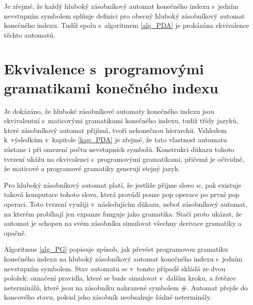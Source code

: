 Je zřejmé, že každý hluboký zásobníkový automat konečného indexu s~jedním nevstupním symbolem splňuje definici pro obecný hluboký zásobníkový automat konečného indexu. Tudíž spolu s~algoritmem \ref{alg_PDA} je prokázána ekvivalence těchto automatů.

\section{Ekvivalence s~programovými gramatikami konečného indexu}


Je dokázáno, že hluboké zásobníkové automaty konečného indexu jsou ekvivalentní s~maticovými gramatikami konečného indexu, tudíž třídy jazyků, které zásobníkový automat přijímá, tvoří nekonečnou hierarchii. \cite{Meduna:DeepPDA} Vzhledem k~výsledkům v~kapitole \ref{kap_PDA} je zřejmé, že tato vlastnost automatu zůstane i při omezení počtu nevstupních symbolů. Konstrukci důkazu tohoto tvrzení ukážu na ekvivalenci s~programovými gramatikami, přičemž je očividné, že maticové a programové gramatiky generují stejný jazyk.

Pro hluboký zásobníkový automat platí, že jestliže přijme slovo $w$, pak existuje taková komputace tohoto slova, která provádí pouze pop operace po první pop operaci. \cite{Meduna:DeepPDA} Toto tvrzení využiji v~následujícím důkazu, neboť zásobníkový automat, na kterém probíhají jen expanze funguje jako gramatika. Stačí proto ukázat, že automat je schopen na svém zásobníku simulovat všechny derivace gramatiky a opačně.


Algoritmus \ref{alg_PG} popisuje způsob, jak převést programovou gramatiku konečného indexu na hluboký zásobníkový automat konečného indexu s~jedním nevstupním symbolem. Stav automatu se v~tomto případě skládá ze dvou položek: označení pravidla, které se bude simulovat v~dalším kroku, a řetězce neterminálů, které jsou na zásobníku nahrazené symbolem $\#$. Automat přejde do koncového stavu, pokud jeho zásobník neobsahuje žádné neterminály.

